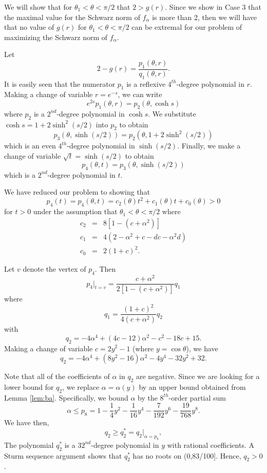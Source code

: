 \documentclass[12pt]{icgft}
\theoremstyle{definition}
\numberwithin{equation}{section}
\begin{document}
We will show that for $\theta_1 < \theta < \pi/2$ that $2 > g(r)$.  Since we show in Case 3 that the maximal value for the Schwarz norm of $f_{\alpha}$ is more than $2$, then we will have that no value of $g(r)$ for $\theta_1 < \theta < \pi/2$ can be extremal for our problem of maximizing the Schwarz norm of $f_{\alpha}$.

Let
$$2 - g(r) = \frac{p_1(\theta,r)}{q_1(\theta,r)}.$$
\noindent It is easily seen that the numerator $p_1$ is a
reflexive $4^{th}$-degree polynomial in $r$.
Making a change of  variable $r=e^{-s}$, we can write
$$e^{2s}p_1(\theta,r) = p_2(\theta,\cosh s)$$
\noindent where $p_2$ is a $2^{nd}$-degree polynomial in $\cosh s$. We substitute $\cosh s = 1 + 2 \sinh^2(s/2)$
into $p_2$ to obtain
$$ p_3(\theta,\sinh(s/2)) = p_2(\theta,1 + 2 \sinh^2(s/2))$$
\noindent which is an even $4^{th}$-degree polynomial in $\sinh(s/2)$.  Finally, we
make a change of variable $\sqrt{t} = \sinh(s/2)$ to obtain
$$ p_4(\theta,t) = p_3(\theta,\sinh(s/2))$$
\noindent which is a $2^{nd}$-degree polynomial in $t$.

We have reduced our problem to showing that
$$p_4(t) = p_4(\theta,t) = c_2(\theta)t^2
+ c_1(\theta)t  + c_0(\theta) > 0$$
\noindent for $t > 0$ under the assumption that $\theta_1 < \theta < \pi/2$ where
\begin{eqnarray*}
c_2 &=& 8[1-(c+\alpha^2)] \\
c_1 &=& 4(2 - \alpha^2 + c - dc -\alpha^2 d) \\
c_0 &=& 2(1+c)^2 .
\end{eqnarray*}

Let  $v$ denote the vertex of $p_4$.  Then
$${p_4}|_{t=v} = \frac{c+\alpha^2}{2[1 - (c+\alpha^2)]}q_1$$
\noindent where
$$q_1 = \frac{(1+c)^2}{4(c+\alpha^2)}q_2$$
\noindent with
$$q_2 = -4\alpha^4 + (4c-12)\alpha^2 -c^2-18c+15 .$$
\noindent Making a change of variable $c = 2y^2-1$ (where $y = \cos \theta$), we have
$$q_2 = -4\alpha^4 + (8y^2-16)\alpha^2 -4y^4 -32y^2 +32 .$$

Note that all of the coefficients of $\alpha$ in $q_2$ are negative.  Since we are looking for a lower bound for $q_2$, we replace $\alpha =
\alpha(y)$ by an upper bound obtained from Lemma \ref{lem:ba}.  Specifically, we bound $\alpha$ by the $8^{th}$-order partial sum
$$\alpha \le p_8 = 1 - \frac{1}{4}y^2 - \frac{1}{16}y^4 - \frac{7}{192}y^6
- \frac{19}{768}y^8 .$$
\noindent We have then,
$$q_2 \ge q_2^* = {q_2}|_{\alpha=p_8},$$
\noindent The polynomial $q_2^*$ is a $32^{nd}$-degree polynomial in $y$ with rational coefficients.  A Sturm sequence argument shows that $q_2^*$ has no roots on (0,83/100].  Hence, $q_2 > 0$.
\end{document}
